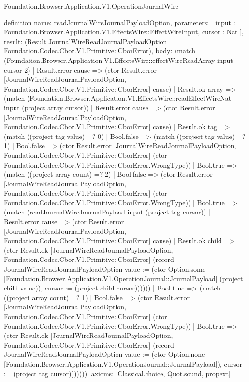 \begin{lexlean}{Foundation.Browser.Application.V1.OperationJournalWire}
\begin{semanticmodule}
definition{
  name: readJournalWireJournalPayloadOption,
  parameters: [
    input : Foundation.Browser.Application.V1.EffectsWire::EffectWireInput,
    cursor : Nat
  ],
  result: (Result JournalWireReadJournalPayloadOption Foundation.Codec.Cbor.V1.Primitive::CborError),
  body: (match (Foundation.Browser.Application.V1.EffectsWire::effectWireReadArray input cursor 2)
    | Result.error cause => (ctor Result.error [JournalWireReadJournalPayloadOption, Foundation.Codec.Cbor.V1.Primitive::CborError] cause)
    | Result.ok array => (match (Foundation.Browser.Application.V1.EffectsWire::readEffectWireNat input (project array cursor))
      | Result.error cause => (ctor Result.error [JournalWireReadJournalPayloadOption, Foundation.Codec.Cbor.V1.Primitive::CborError] cause)
      | Result.ok tag => (match ((project tag value) =? 0)
        | Bool.false => (match ((project tag value) =? 1)
          | Bool.false => (ctor Result.error [JournalWireReadJournalPayloadOption, Foundation.Codec.Cbor.V1.Primitive::CborError] (ctor Foundation.Codec.Cbor.V1.Primitive::CborError.WrongType))
          | Bool.true => (match ((project array count) =? 2)
            | Bool.false => (ctor Result.error [JournalWireReadJournalPayloadOption, Foundation.Codec.Cbor.V1.Primitive::CborError] (ctor Foundation.Codec.Cbor.V1.Primitive::CborError.WrongType))
            | Bool.true => (match (readJournalWireJournalPayload input (project tag cursor))
              | Result.error cause => (ctor Result.error [JournalWireReadJournalPayloadOption, Foundation.Codec.Cbor.V1.Primitive::CborError] cause)
              | Result.ok child => (ctor Result.ok [JournalWireReadJournalPayloadOption, Foundation.Codec.Cbor.V1.Primitive::CborError] (record JournalWireReadJournalPayloadOption {value := (ctor Option.some [Foundation.Browser.Application.V1.OperationJournal::JournalPayload] (project child value)), cursor := (project child cursor)})))))
        | Bool.true => (match ((project array count) =? 1)
          | Bool.false => (ctor Result.error [JournalWireReadJournalPayloadOption, Foundation.Codec.Cbor.V1.Primitive::CborError] (ctor Foundation.Codec.Cbor.V1.Primitive::CborError.WrongType))
          | Bool.true => (ctor Result.ok [JournalWireReadJournalPayloadOption, Foundation.Codec.Cbor.V1.Primitive::CborError] (record JournalWireReadJournalPayloadOption {value := (ctor Option.none [Foundation.Browser.Application.V1.OperationJournal::JournalPayload]), cursor := (project tag cursor)})))))),
  axioms: [Classical.choice, Quot.sound, propext]
}


\end{semanticmodule}
\end{lexlean}

